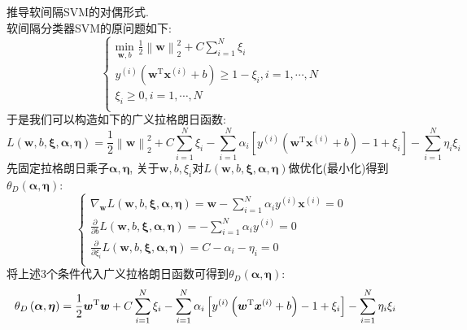 \documentclass{article}
\begin{document}
\pagebreak


\begin{homeworkProblem}
	推导软间隔SVM的对偶形式.
	\\

	\solution 软间隔分类器SVM的原问题如下:
	$$
	\begin{cases}
		\displaystyle \underset{\boldsymbol{w},b}{\text{min}}\,\,\frac{1}{2}\left\| \boldsymbol{w} \right\| _{2}^{2}+C\sum_{i=1}^N{\xi _i}\\
		y^{\left( i \right)}\left( \boldsymbol{w}^{\text{T}}\boldsymbol{x}^{\left( i \right)}+b \right) \ge 1-\xi _i,i=1,\cdots ,N\\
		\xi _i\ge 0,i=1,\cdots ,N\\
	\end{cases}
	$$
	于是我们可以构造如下的广义拉格朗日函数:
	$$
	L\left( \boldsymbol{w},b,\boldsymbol{\xi },\boldsymbol{\alpha },\boldsymbol{\eta } \right) =\frac{1}{2}\left\| \boldsymbol{w} \right\| _{2}^{2}+C\sum_{i=1}^N{\xi _i}-\sum_{i=1}^N{\alpha _i\left[ y^{\left( i \right)}\left( \boldsymbol{w}^{\text{T}}\boldsymbol{x}^{\left( i \right)}+b \right) -1+\xi _i \right]}-\sum_{i=1}^N{\eta _i\xi _i}
	$$
	先固定拉格朗日乘子$\boldsymbol{\alpha},\boldsymbol{\eta}$, 关于$\boldsymbol{w},b,\xi_i$对$L\left( \boldsymbol{w},b,\boldsymbol{\xi },\boldsymbol{\alpha },\boldsymbol{\eta } \right)$做优化(最小化)得到$\theta_D(\boldsymbol{\alpha},\boldsymbol{\eta})$:
	$$
	\begin{cases}
		\displaystyle \nabla _{\boldsymbol{w}}L\left( \boldsymbol{w},b,\boldsymbol{\xi },\boldsymbol{\alpha },\boldsymbol{\eta } \right) =\boldsymbol{w}-\sum_{i=1}^N{\alpha _iy^{\left( i \right)}\boldsymbol{x}^{\left( i \right)}}=0\\
		\displaystyle \frac{\partial}{\partial b}L\left( \boldsymbol{w},b,\boldsymbol{\xi },\boldsymbol{\alpha },\boldsymbol{\eta } \right) =-\sum_{i=1}^N{\alpha _iy^{\left( i \right)}}=0\\
		\displaystyle \frac{\partial}{\partial \xi _i}L\left( \boldsymbol{w},b,\boldsymbol{\xi },\boldsymbol{\alpha },\boldsymbol{\eta } \right) =C-\alpha _i-\eta _i=0\\
	\end{cases}
	$$
	将上述3个条件代入广义拉格朗日函数可得到$\theta_D(\boldsymbol{\alpha},\boldsymbol{\eta})$:
	\begin{align}
		\theta _D\left( \boldsymbol{\alpha },\boldsymbol{\eta } \right) &=\frac{1}{2}\boldsymbol{w}^{\text{T}}\boldsymbol{w}+C\sum_{i=1}^N{\xi _i}-\sum_{i=1}^N{\alpha _i\left[ y^{\left( i \right)}\left( \boldsymbol{w}^{\text{T}}\boldsymbol{x}^{\left( i \right)}+b \right) -1+\xi _i \right]}-\sum_{i=1}^N{\eta _i\xi _i} \notag

\end{align}
\end{homeworkProblem}
\end{document}
